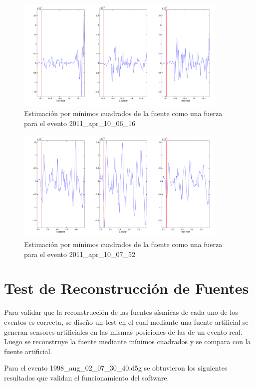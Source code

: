 \begin{figure}[H]
\includegraphics[width=0.9\textwidth,height=0.4\textheight]{linea_timerev/figuras/plotSrcEv28src.pdf}
\caption{Estimación por mínimos cuadrados de la fuente como una fuerza para el
evento 2011\_apr\_10\_06\_16}
\end{figure}
\begin{figure}[H]
\includegraphics[width=0.9\textwidth,height=0.4\textheight]{linea_timerev/figuras/plotSrcEv29src.pdf}
\caption{Estimación por mínimos cuadrados de la fuente como una fuerza para el
evento 2011\_apr\_10\_07\_52}
\end{figure}

\section{Test de Reconstrucci\'on de Fuentes}

Para validar que la reconstrucción de las fuentes sísmicas de cada uno de los
eventos es correcta, se diseño un test en el cual mediante una fuente artificial
se generan sensores artificiales en las mismas posiciones de las de un evento
real. Luego se reconstruye la fuente mediante mínimos cuadrados y se compara con
la fuente artificial.

Para el evento 1998\_aug\_02\_07\_30\_40.d5g se obtuvieron los siguientes
resultados que validan el funcionamiento del software.


